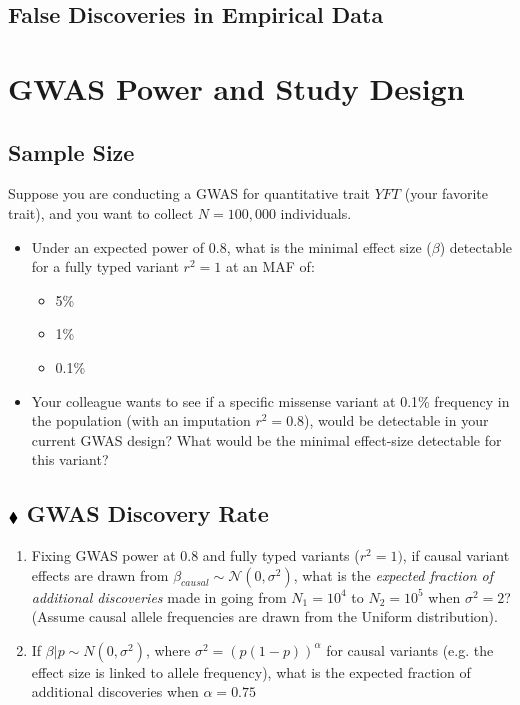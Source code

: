 \documentclass{pset}
\begin{document}
\subsection*{}


\subsection*{False Discoveries in Empirical Data}






\section*{GWAS Power and Study Design}

\subsection*{Sample Size}

Suppose you are conducting a GWAS for quantitative trait $YFT$ (your favorite trait), and you want to collect $N=100,000$ individuals. 

\begin{itemize}
	\item Under an expected power of 0.8, what is the minimal effect size ($\beta$) detectable for a fully typed variant $r^2 = 1$ at an MAF of: 
	\begin{itemize}
		\item 5\% 
		\item 1\%
		\item 0.1\%
	\end{itemize}
	\item Your colleague wants to see if a specific missense variant at 0.1\% frequency in the population (with an imputation $r^2 = 0.8$), would be detectable in your current GWAS design? What would be the minimal effect-size detectable for this variant?  
\end{itemize}

\subsection*{$\mathbin{\blacklozenge}$ GWAS Discovery Rate} 

\begin{enumerate}
\item Fixing GWAS power at 0.8 and fully typed variants ($r^2 = 1)$, if causal variant effects are drawn from $\beta_{causal} \sim \mathcal{N}(0,\sigma^2)$, what is the \textit{expected fraction of additional discoveries} made in going from $N_1 = 10^4$ to $N_2 = 10^5$ when $\sigma^2 = 2$? (Assume causal allele frequencies are drawn from the Uniform distribution). 
	
\item If $\beta | p \sim N(0, \sigma^2)$, where $\sigma^2 = \left(p(1-p)\right)^{\alpha}$ for causal variants (e.g. the effect size is linked to allele frequency), what is the expected fraction of additional discoveries when $\alpha = 0.75$ 
\end{enumerate}
\end{document}
